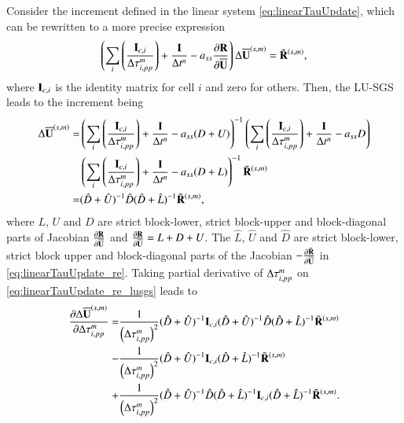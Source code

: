 Consider the increment defined in the linear system \eqref{eq:linearTauUpdate},
which can be rewritten to a more precise expression
\begin{equation}
    \left(\sum_i\left(\frac{\eye_{c,i}}{\inc \tau^m_{i,pp}}\right) + \frac{\eye}{\inc t^n} -a_{ss}\partialderivative{\R }{\uu} \right) \inc \uu^{\left(s,m\right)}
    = \tilde{\R}^{\left(s,m\right)},
    \label{eq:linearTauUpdate_re}
\end{equation}
where $\mathbf{I}_{c,i}$ is 
the identity matrix for cell $i$ and zero for others.
Then, the LU-SGS leads to the increment being
\begin{equation}
    \begin{aligned}
        \mathrm\Delta \overline{\mathbf{U}}^{\left(s,m\right)}
     = &
    \left(\sum_i\left(\frac{\mathbf{I}_{c,i}}{\mathrm\Delta \tau^m_{i,pp}}\right) + \frac{\mathbf{I}}{\mathrm\Delta t^n} -a_{ss}(D+U) \right)^{-1}
    \left(\sum_i\left(\frac{\mathbf{I}_{c,i}}{\mathrm\Delta \tau^m_{i,pp}}\right) + \frac{\mathbf{I}}{\mathrm\Delta t^n} -a_{ss}D \right)\\
    &
    \left(\sum_i\left(\frac{\mathbf{I}_{c,i}}{\mathrm\Delta \tau^m_{i,pp}}\right) + \frac{\mathbf{I}}{\mathrm\Delta t^n} -a_{ss}(D+L) \right)^{-1}
    \tilde{\mathbf{R}}^{\left(s,m\right)} \\
    = & (\hat{D}+\hat{U})^{-1}\hat{D}(\hat{D}+\hat{L})^{-1}
    \tilde{\mathbf{R}}^{\left(s,m\right)} , 
    \end{aligned}
    \label{eq:linearTauUpdate_re_lusgs}
\end{equation}
where $L$, $U$ and $D$ are strict block-lower, strict block-upper and block-diagonal 
parts of Jacobian $\partialderivative{\R }{\uu}$ and $\partialderivative{\R }{\uu} = L + D + U$.
The $\hat L$, $\hat U$ and $\hat D$ are strict block-lower, strict block upper and block-diagonal 
parts of the Jacobian $-\partialderivative{\tilde\R }{\uu}$ in \eqref{eq:linearTauUpdate_re}.
Taking partial derivative of $\mathrm\Delta\tau^m_{i,pp}$ on \eqref{eq:linearTauUpdate_re_lusgs} leads to
\begin{equation}
    \begin{aligned}
       \pdv{\mathrm\Delta\overline{\mathbf{U}}^{\left(s,m\right)}}{\mathrm\Delta\tau^m_{i,pp}}
    = & \frac{1}{\left(\mathrm\Delta\tau^m_{i,pp}\right)^2}
    (\hat{D}+\hat{U})^{-1}\mathbf{I}_{c,i}(\hat{D}+\hat{U})^{-1}\hat{D}(\hat{D}+\hat{L})^{-1}
    \tilde{\mathbf{R}}^{\left(s,m\right)} \\
    - & \frac{1}{\left(\mathrm\Delta\tau^m_{i,pp}\right)^2}
    (\hat{D}+\hat{U})^{-1}\mathbf{I}_{c,i}(\hat{D}+\hat{L})^{-1}
    \tilde{\mathbf{R}}^{\left(s,m\right)} \\
    + & \frac{1}{\left(\mathrm\Delta\tau^m_{i,pp}\right)^2}
    (\hat{D}+\hat{U})^{-1}\hat{D}(\hat{D}+\hat{L})^{-1}\mathbf{I}_{c,i}(\hat{D}+\hat{L})^{-1}
    \tilde{\mathbf{R}}^{\left(s,m\right)}.
    \end{aligned}
    \label{eq:linearTauUpdate_re_lusgs_pdvtau}
\end{equation}
